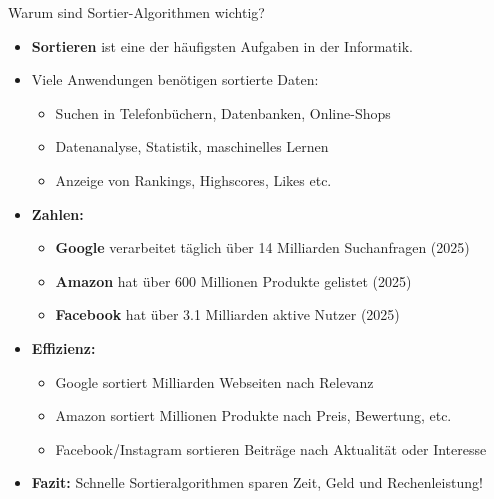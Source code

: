 \begin{frame}{Warum sind Sortier-Algorithmen wichtig?}
	\begin{itemize}[<+->]
		\item \textbf{Sortieren} ist eine der häufigsten Aufgaben in der Informatik.
		\item Viele Anwendungen benötigen sortierte Daten:
		      \begin{itemize}
			      \item Suchen in Telefonbüchern, Datenbanken, Online-Shops
			      \item Datenanalyse, Statistik, maschinelles Lernen
			      \item Anzeige von Rankings, Highscores, Likes etc.
		      \end{itemize}
		\item \textbf{Zahlen:}
		      \begin{itemize}
			      \item \textbf{Google} verarbeitet täglich über 14 Milliarden Suchanfragen (2025)
			      \item \textbf{Amazon} hat über 600 Millionen Produkte gelistet (2025)
			      \item \textbf{Facebook} hat über 3.1 Milliarden aktive Nutzer (2025)
		      \end{itemize}
		\item \textbf{Effizienz:}
		      \begin{itemize}
			      \item Google sortiert Milliarden Webseiten nach Relevanz
			      \item Amazon sortiert Millionen Produkte nach Preis, Bewertung, etc.
			      \item Facebook/Instagram sortieren Beiträge nach Aktualität oder Interesse
		      \end{itemize}

		\item \textbf{Fazit:} Schnelle Sortieralgorithmen sparen Zeit, Geld und Rechenleistung!
	\end{itemize}
\end{frame}

